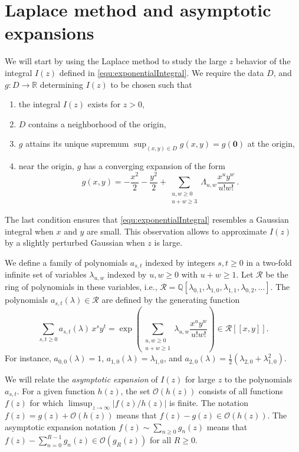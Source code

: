 \documentclass[english]{ourlematemasingle}
\numberwithin{theorem}{section}
\theoremstyle{remark}
\newcommand{\R}{\mathbb{R}}
\newcommand{\Q}{\mathbb{Q}}
\newcommand{\ol}{\Lambda}
\newcommand{\bigO}{\mathcal{O}}
\begin{document}
\section{Laplace method and asymptotic expansions}
\label{sec:laplace}
We will start by using the Laplace method to study the large $z$ behavior of 
the integral $I(z)$ defined in \eqref{equ:exponentialIntegral}.
We require the data $D$, and $g: D\rightarrow \R$ determining $I(z)$ to be chosen such that
\begin{enumerate}
\item the integral $I(z)$ exists for $z > 0$, 
\item 
$D$ contains a neighborhood of the origin,
\item 
$g$ attains its unique supremum $\sup_{(x,y)\in D}g(x,y) \!=\! g(\mathbf{0})$ at the origin,
\item 
near the origin, $g$ has a converging  expansion of the form
\begin{equation}
\label{eq:gdef}
g(x,y) = - \frac{x^2}{2} - \frac{y^2}{2} + \sum_{\substack{u,w \geq 0\\ u+w \geq 3}} \ol_{u,w} \frac{x^u y^w}{u!w!}\, .
\end{equation}
\end{enumerate}
The last condition ensures that \eqref{equ:exponentialIntegral} resembles a Gaussian integral 
when $x$ and $y$ are small. This observation allows to approximate $I(z)$ by a slightly perturbed Gaussian
when $z$ is large.\par 

We define a family of polynomials $a_{s,t}$ indexed by integers $s,t \geq 0$ in a two-fold infinite set of variables $\lambda_{u,w}$ indexed by $u,w \geq 0$ with $u+w \geq 1$.  Let $\mathcal R$ be the ring of polynomials in these variables, i.e., $\mathcal R = \Q[\lambda_{0,1},\lambda_{1,0},\lambda_{1,1}, \lambda_{0,2}, \ldots]$.
The polynomials $a_{s,t}(\lambda) \in \mathcal R$ are defined by the generating function
\begin{equation}
\label{eq:coeffs_extraction_gen_funct}
    \sum_{s,t \geq 0} a_{s,t}(\lambda)\, x^s y^t =
\exp\left(\sum_{\substack{u,w \geq 0\\u+w \geq 1}} \lambda_{u,w} \frac{x^u y^w}{u!w!}\right) \in \mathcal R[[x,y]].
\end{equation}
For instance,
$a_{0,0}(\lambda) = 1$,
$a_{1,0}(\lambda) = \lambda_{1,0}$,
and 
$a_{2,0}(\lambda) = \frac12 ( \lambda_{2,0} + \lambda_{1,0}^2 )$.

We will relate the \emph{asymptotic expansion} of $I(z)$ for large $z$ to the polynomials $a_{s,t}$.
For a given function $h(z)$, the set $\bigO(h(z))$ consists of all functions
$f(z)$ for which $\limsup_{z\rightarrow \infty} \left|{f(z)}/{h(z)}\right|$ is finite. 
The notation $f(z) = g(z) + \bigO(h(z))$ means that $f(z)-g(z) \in \bigO(h(z))$. 
The asymptotic expansion notation
$f(z) \sim \sum_{n \geq 0} g_n(z)$  means that  $f(z) - \sum_{n=0}^{R-1} g_n(z) \in \bigO(g_{R}(z))$
for all $R \geq 0$.
\end{document}
